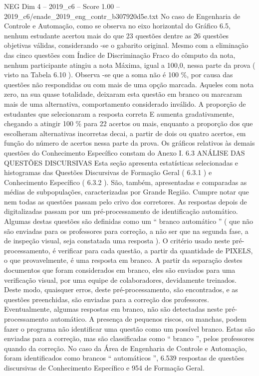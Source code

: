 \begin{textsample}{NEG Dim 4 – 2019\_c6 – Score 1.00 – 2019\_c6/enade\_2019\_eng\_contr\_b307920d5e.txt}
No caso de Engenharia de Controle e Automação, como se observa no eixo horizontal do Gráfico 6.5, nenhum estudante acertou mais do que 23 questões dentre as 26 questões objetivas válidas, considerando -se o gabarito original.
Mesmo com a eliminação das cinco questões com Índice de Discriminação Fraco do cômputo da nota, nenhum participante atingiu a nota Máxima, igual a 100,0, nessa parte da prova ( visto na Tabela 6.10 ).
Observa -se que a soma não é 100 \%, por causa das questões não respondidas ou com mais de uma opção marcada.
Aqueles com nota zero, na sua quase totalidade, deixaram esta questão em branco ou marcaram mais de uma alternativa, comportamento considerado inválido.
A proporção de estudantes que selecionaram a resposta correta E aumenta gradativamente, chegando a atingir 100 \% para 22 acertos ou mais, enquanto a proporção dos que escolheram alternativas incorretas decai, a partir de dois ou quatro acertos, em função do número de acertos nessa parte da prova.
Os gráficos relativos às demais questões do Conhecimento Específico constam do Anexo I. 6.3 ANÁLISE DAS QUESTÕES DISCURSIVAS Esta seção apresenta estatísticas selecionadas e histogramas das Questões Discursivas de Formação Geral ( 6.3.1 ) e Conhecimento Específico ( 6.3.2 ).
São, também, apresentadas e comparadas as médias de subpopulações, caracterizadas por Grande Região.
Cumpre notar que nem todas as questões passam pelo crivo dos corretores.
As respostas depois de digitalizadas passam por um pré-processamento de identificação automático.
Algumas destas questões são definidas como um “ branco automático ” ( que não são enviadas para os professores para correção, a não ser que na segunda fase, a de inspeção visual, seja constatada uma resposta ).
O critério usado neste pré-processamento, é verificar para cada questão, a partir da quantidade de PIXELS, o que provavelmente, é uma resposta em branco.
A partir da separação destes documentos que foram considerados em branco, eles são enviados para uma verificação visual, por uma equipe de colaboradores, devidamente treinados.
Deste modo, quaisquer erros, deste pré-processamento, são encontrados, e as questões preenchidas, são enviadas para a correção dos professores.
Eventualmente, algumas respostas em branco, não são detectadas neste pré-processamento automático.
A presença de pequenos riscos, ou manchas, podem fazer o programa não identificar uma questão como um possível branco.
Estas são enviadas para a correção, mas são classificadas como “ branco ”, pelos professores quando da correção.
No caso da Área de Engenharia de Controle e Automação, foram identificados como brancos “ automáticos ”, 6.539 respostas de questões discursivas de Conhecimento Específico e 954 de Formação Geral.

\end{textsample}
